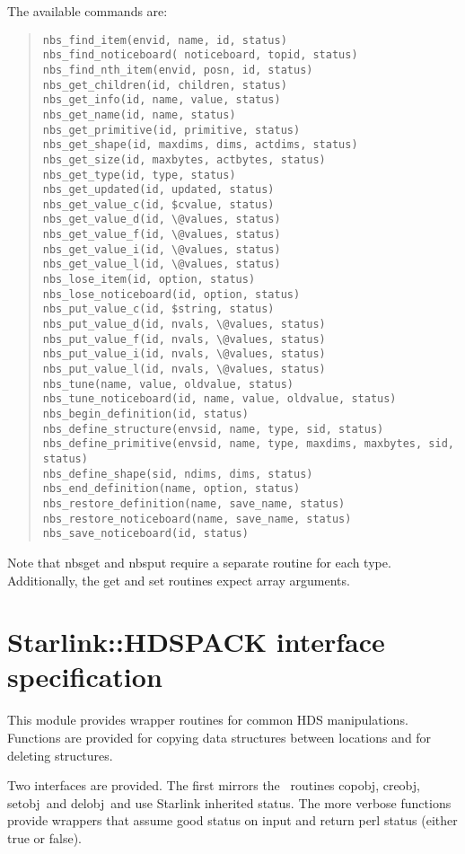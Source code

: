 \documentclass[twoside,11pt]{article}
\newenvironment{myquote}{\begin{quote}\begin{small}}{\end{small}\end{quote}}
\newcommand{\task}[1]{{\sf #1}}
\newcommand{\Figaro}{\xref{{\sc{Figaro}}}{sun86}{}}
\newcommand{\delobj}{\xref{\task{delobj}}{sun86}{DELOBJ}}
\newcommand{\creobj}{\xref{\task{creobj}}{sun86}{CREOBJ}}
\newcommand{\setobj}{\xref{\task{setobj}}{sun86}{SETOBJ}}
\newcommand{\copobj}{\xref{\task{copobj}}{sun86}{COPOBJ}}
\newcommand{\xref}[3]{#1}
\renewcommand{\_}{\texttt{\symbol{95}}}
\begin{document}
The available commands are:
\begin{myquote}
\begin{verbatim}
nbs_find_item(envid, name, id, status)
nbs_find_noticeboard( noticeboard, topid, status)
nbs_find_nth_item(envid, posn, id, status)
nbs_get_children(id, children, status)
nbs_get_info(id, name, value, status)
nbs_get_name(id, name, status)
nbs_get_primitive(id, primitive, status)
nbs_get_shape(id, maxdims, dims, actdims, status)
nbs_get_size(id, maxbytes, actbytes, status)
nbs_get_type(id, type, status)
nbs_get_updated(id, updated, status)
nbs_get_value_c(id, $cvalue, status)
nbs_get_value_d(id, \@values, status)
nbs_get_value_f(id, \@values, status)
nbs_get_value_i(id, \@values, status)
nbs_get_value_l(id, \@values, status)
nbs_lose_item(id, option, status)
nbs_lose_noticeboard(id, option, status)
nbs_put_value_c(id, $string, status)
nbs_put_value_d(id, nvals, \@values, status)
nbs_put_value_f(id, nvals, \@values, status)
nbs_put_value_i(id, nvals, \@values, status)
nbs_put_value_l(id, nvals, \@values, status)
nbs_tune(name, value, oldvalue, status)
nbs_tune_noticeboard(id, name, value, oldvalue, status)
nbs_begin_definition(id, status)
nbs_define_structure(envsid, name, type, sid, status)
nbs_define_primitive(envsid, name, type, maxdims, maxbytes, sid, status)
nbs_define_shape(sid, ndims, dims, status)
nbs_end_definition(name, option, status)
nbs_restore_definition(name, save_name, status)
nbs_restore_noticeboard(name, save_name, status)
nbs_save_noticeboard(id, status)
\end{verbatim}
\end{myquote}

Note that nbs\_{}get\_{} and nbs\_{}put\_{} require a separate routine for each
type. Additionally, the get and set routines expect array arguments.

\section{Starlink::HDSPACK interface specification}%

This module provides wrapper routines for common HDS manipulations.
Functions are provided for copying data structures between locations
and for deleting structures.

Two interfaces are provided. The first mirrors the \Figaro\ routines
\copobj, \creobj, \setobj\ and \delobj\ and use Starlink inherited status.
The more verbose functions provide wrappers that assume good status
on input and return perl status (either true or false).
\end{document}
